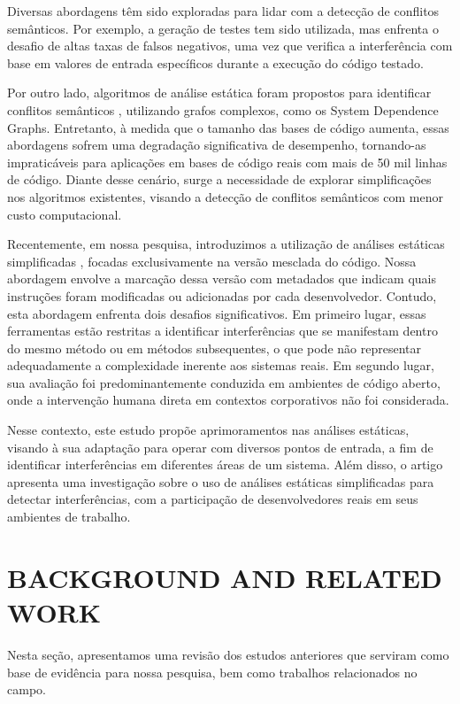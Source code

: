 \documentclass[sigconf,review]{acmart}
\begin{document}
Diversas abordagens têm sido exploradas para lidar com a detecção de conflitos semânticos. Por exemplo, a geração de testes \cite{silva2022detecting} tem sido utilizada, mas enfrenta o desafio de altas taxas de falsos negativos, uma vez que verifica a interferência com base em valores de entrada específicos durante a execução do código testado.

Por outro lado, algoritmos de análise estática foram propostos para identificar conflitos semânticos \cite{barros2017using, binkley1995program, Horwitz1989IntegratingNV}, utilizando grafos complexos, como os System Dependence Graphs. Entretanto, à medida que o tamanho das bases de código aumenta, essas abordagens sofrem uma degradação significativa de desempenho, tornando-as impraticáveis para aplicações em bases de código reais com mais de 50 mil linhas de código. Diante desse cenário, surge a necessidade de explorar simplificações nos algoritmos existentes, visando a detecção de conflitos semânticos com menor custo computacional.

Recentemente, em nossa pesquisa, introduzimos a utilização de análises estáticas simplificadas \cite{galileu}, focadas exclusivamente na versão mesclada do código. Nossa abordagem envolve a marcação dessa versão com metadados que indicam quais instruções foram modificadas ou adicionadas por cada desenvolvedor. Contudo, esta abordagem enfrenta dois desafios significativos. Em primeiro lugar, essas ferramentas estão restritas a identificar interferências que se manifestam dentro do mesmo método ou em métodos subsequentes, o que pode não representar adequadamente a complexidade inerente aos sistemas reais. Em segundo lugar, sua avaliação foi predominantemente conduzida em ambientes de código aberto, onde a intervenção humana direta em contextos corporativos não foi considerada. 

Nesse contexto, este estudo propõe aprimoramentos nas análises estáticas, visando à sua adaptação para operar com diversos pontos de entrada, a fim de identificar interferências em diferentes áreas de um sistema. Além disso, o artigo apresenta uma investigação sobre o uso de análises estáticas simplificadas para detectar interferências, com a participação de desenvolvedores reais em seus ambientes de trabalho.

\section{BACKGROUND AND RELATED WORK}
Nesta seção, apresentamos uma revisão dos estudos anteriores que serviram como base de evidência para nossa pesquisa, bem como trabalhos relacionados no campo.
\end{document}
